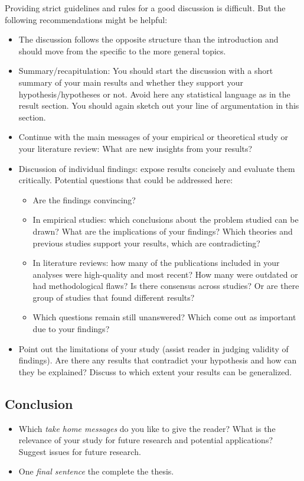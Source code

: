 \documentclass[a4paper,12pt]{article}
\providecommand{\tightlist}{%
  \setlength{\itemsep}{0pt}\setlength{\parskip}{0pt}}
\begin{document}
Providing strict guidelines and rules for a good discussion is difficult. But the following recommendations might be helpful:
\begin{itemize}
\tightlist
\item
  The discussion follows the opposite structure than the introduction and should move from the specific to the more general topics.
\item
  Summary/recapitulation: You should start the discussion with a short summary of your main results and whether they support your hypothesis/hypotheses or not. Avoid here any statistical language as in the result section. You should again sketch out your line of argumentation in this section.
\item
  Continue with the main messages of your empirical or theoretical study or your literature review: What are new insights from your results?
\item
  Discussion of individual findings: expose results concisely and evaluate them critically. Potential questions that could be addressed here:
  \begin{itemize}
  \tightlist
  \item
    Are the findings convincing?
  \item
    In empirical studies: which conclusions about the problem studied can be drawn? What are the implications of your findings? Which theories and previous studies support your results, which are contradicting?
  \item
    In literature reviews: how many of the publications included in your analyses were high-quality and most recent? How many were outdated or had methodological flaws? Is there consensus across studies? Or are there group of studies that found different results?
  \item
    Which questions remain still unanswered? Which come out as important due to your findings?
  \end{itemize}
\item
  Point out the limitations of your study (assist reader in judging validity of findings). Are there any results that contradict your hypothesis and how can they be explained? Discuss to which extent your results can be generalized.
\end{itemize}
\hypertarget{conclusion}{%
\subsection{Conclusion}\label{conclusion}}
\begin{itemize}
\tightlist
\item
  Which \emph{take home messages} do you like to give the reader? What is the relevance of your study for future research and potential applications? Suggest issues for future research.
\item
  One \emph{final sentence} the complete the thesis.
\end{itemize}
\newpage
\end{document}
